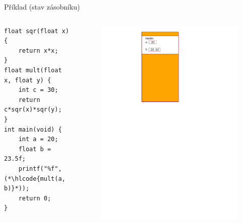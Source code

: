 \documentclass[14pt,aspectratio=169]{beamer}
\begin{document}
    \begin{frame}[t,fragile]{Příklad (stav zásobníku)}
        \begin{columns}[onlytextwidth]
            \begin{column}{0.55\textwidth}
                \begin{lstlisting}
float sqr(float x) {
    return x*x;
}
float mult(float x, float y) {
    int c = 30;
    return c*sqr(x)*sqr(y);
}
int main(void) {
    int a = 20;
    float b = 23.5f;
    printf("%f", (*\hlcode{mult(a, b)}*));
    return 0;
}
                \end{lstlisting}
            \end{column}
            \begin{column}{0.4\textwidth}
                \begin{figure}
                    \centering
                    \includegraphics[scale=.6]{images/zasobnik_stav_3.pdf}
                \end{figure}
            \end{column}
        \end{columns}
    \end{frame}
\end{document}
